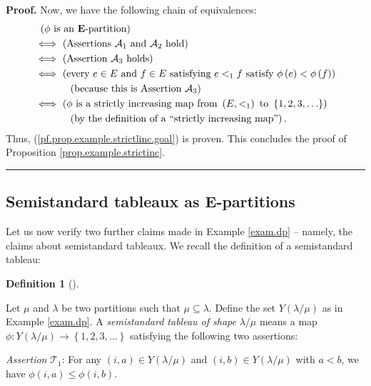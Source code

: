 \documentclass[numbers=enddot,12pt,final,onecolumn,notitlepage,abstracton]{scrartcl}
\theoremstyle{definition}
\newtheorem{defi}[theo]{Definition}
\newenvironment{definition}[1][]
{\begin{defi}[#1]\begin{leftbar}}
{\end{leftbar}\end{defi}}
\newenvironment{proof}[1][Proof]{\noindent\textbf{#1.} }{\ \rule{0.5em}{0.5em}}
\newenvironment{verlong}{}{}
\begin{document}
\begin{verlong}
\begin{footnotesize}
\begin{proof}
Now, we have the following chain of equivalences:%
\begin{align*}
&  \ \left(  \phi\text{ is an }\mathbf{E}\text{-partition}\right) \\
&  \Longleftrightarrow\ \left(  \text{Assertions }\mathcal{A}_{1}\text{ and
}\mathcal{A}_{2}\text{ hold}\right) \\
&  \Longleftrightarrow\ \left(  \text{Assertion }\mathcal{A}_{3}\text{
holds}\right) \\
&  \Longleftrightarrow\ \left(  \text{every }e\in E\text{ and }f\in E\text{
satisfying }e<_{1}f\text{ satisfy }\phi\left(  e\right)  <\phi\left(
f\right)  \right) \\
&  \ \ \ \ \ \ \ \ \ \ \left(  \text{because this is Assertion }%
\mathcal{A}_{3}\right) \\
&  \Longleftrightarrow\ \left(  \phi\text{ is a strictly increasing map from
}\left(  E,<_{1}\right)  \text{ to }\left\{  1,2,3,\ldots\right\}  \right) \\
&  \ \ \ \ \ \ \ \ \ \ \left(  \text{by the definition of a \textquotedblleft
strictly increasing map\textquotedblright}\right)  .
\end{align*}
Thus, (\ref{pf.prop.example.strictlinc.goal}) is proven. This concludes the
proof of Proposition \ref{prop.example.strictinc}.
\end{proof}

\subsection{Semistandard tableaux as $\mathbf{E}$-partitions}

Let us now verify two further claims made in Example \ref{exam.dp} -- namely,
the claims about semistandard tableaux. We recall the definition of a
semistandard tableau:

\begin{definition}
\label{def.sst}Let $\mu$ and $\lambda$ be two partitions such that
$\mu\subseteq\lambda$. Define the set $Y\left(  \lambda/\mu\right)  $ as in
Example \ref{exam.dp}. A \textit{semistandard tableau of shape }$\lambda/\mu$
means a map $\phi:Y\left(  \lambda/\mu\right)  \rightarrow\left\{
1,2,3,\ldots\right\}  $ satisfying the following two assertions:

\textit{Assertion }$\mathcal{T}_{1}$: For any $\left(  i,a\right)  \in
Y\left(  \lambda/\mu\right)  $ and $\left(  i,b\right)  \in Y\left(
\lambda/\mu\right)  $ with $a<b$, we have $\phi\left(  i,a\right)  \leq
\phi\left(  i,b\right)  $.


\end{definition}
\end{footnotesize}
\end{verlong}
\end{document}
